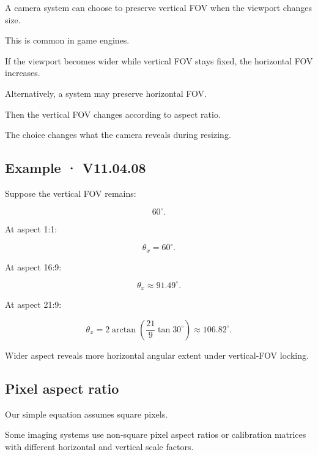 \hypertarget{02-foundations-ii-ch033-horizontal-versus-vertical-fov-locking}{}

A camera system can choose to preserve vertical FOV when the viewport changes size.

This is common in game engines.

If the viewport becomes wider while vertical FOV stays fixed, the horizontal FOV increases.

Alternatively, a system may preserve horizontal FOV.

Then the vertical FOV changes according to aspect ratio.

The choice changes what the camera reveals during resizing.

\begin{allmightroleexample}

\subsection{Example · V11.04.08}\label{02-foundations-ii-ch033-example-v11.04.08}

\hypertarget{02-foundations-ii-ch033-example-v11.04.08}{}

Suppose the vertical FOV remains:

\end{allmightroleexample}

\[
 60^\circ.
\]

At aspect 1:1:

\[
 \theta_x=60^\circ.
\]

At aspect 16:9:

\[
 \theta_x\approx91.49^\circ.
\]

At aspect 21:9:

\[
 \theta_x= 2\arctan\left(\frac{21}{9}\tan30^\circ\right) \approx106.82^\circ.
\]

Wider aspect reveals more horizontal angular extent under vertical-FOV locking.

\subsection{Pixel aspect ratio}\label{02-foundations-ii-ch033-pixel-aspect-ratio}

\hypertarget{02-foundations-ii-ch033-pixel-aspect-ratio}{}

Our simple equation assumes square pixels.

Some imaging systems use non-square pixel aspect ratios or calibration matrices with different horizontal and vertical scale factors.

